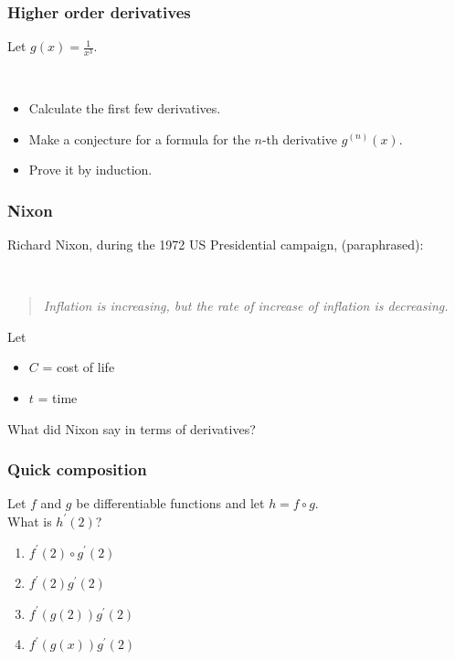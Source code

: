 \documentclass[14pt]{beamer}
\newcommand {\DS} [1] {${\displaystyle #1}$}
\begin{document}

\begin{frame}[t]
\frametitle{Higher order derivatives}


Let \DS{g(x) = \frac{1}{x^3}}.

\

\begin{itemize}
	\item Calculate the first few derivatives.  
	\item Make a conjecture for a formula for  the $n$-th derivative \DS{g^{(n)}(x)}.
	\item  Prove it by induction.
\end{itemize}

\end{frame}

\begin{frame}
\frametitle{Nixon}


Richard Nixon, during the 1972 US Presidential campaign, (paraphrased):

\
\begin{quote}
\emph{Inflation is increasing, but the rate of increase of inflation is decreasing.}
\end{quote}

\vfill

Let 
	\begin{itemize}
		\item $C$ = cost of life
		\item  $t$ = time
	\end{itemize}
What did Nixon say in terms of derivatives?

\vfill

\end{frame}
\begin{frame}
\frametitle{Quick composition}

 Let $f$ and $g$ be differentiable functions and let $h=f\circ g$. \\ What is $h^{\prime}(2)$?
\begin {enumerate}
\item $f^{\prime}(2)\circ g^{\prime}(2)$
\item $f^{\prime}(2)g^{\prime}(2)$
\item $f^{\prime}(g(2)) g^{\prime}(2)$
\item $f^{\prime}(g(x)) g^{\prime}(2)$
\end{enumerate}

\end{frame}
\end{document}
